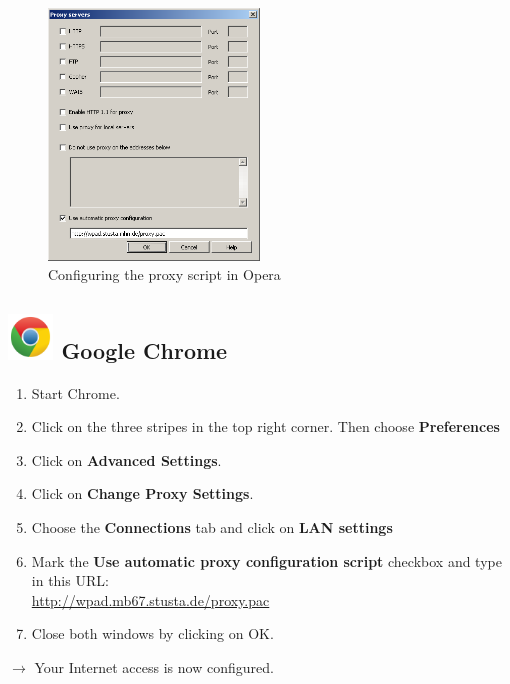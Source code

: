 \documentclass[a4paper,12pt]{scrartcl}
\newcommand{\optemph}[1]{\textbf{#1}}
\begin{document}
\newpage
\begin{figure}
  \begin{center}
    \includegraphics[width=0.5\textwidth,keepaspectratio]{Bilder/Proxy_Opera_EN}
  \end{center}
  \caption{Configuring the proxy script in Opera}
\end{figure}

\subsection*{\includegraphics[height=1.2cm,keepaspectratio]{Bilder/Chrome_2011_logo} Google Chrome}
\begin{enumerate}
    \item Start Chrome.
	\item Click on the three stripes in the top right corner. Then choose \optemph{Preferences}
	\item Click on \optemph{Advanced Settings}.
	\item Click on \optemph{Change Proxy Settings}.
	\item Choose the \optemph{Connections} tab and click on \optemph{LAN settings}
	\item Mark the \optemph{Use automatic proxy configuration script} checkbox and type in this URL: \\ \url{http://wpad.mb67.stusta.de/proxy.pac}
    \item Close both windows by clicking on OK.
\end{enumerate}
$\rightarrow$ Your Internet access is now configured.
\end{document}
